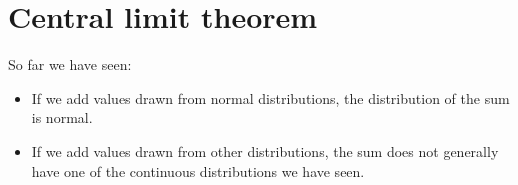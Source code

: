 \documentclass[12pt]{book}
\begin{document}

%
%
%
%

%
%






\section{Central limit theorem}
\label{CLT}

So far we have seen:

\begin{itemize}

\item If we add values drawn from normal distributions, the distribution
of the sum is normal.


\item If we add values drawn from other distributions, the sum does not
generally have one of the continuous distributions we have seen.

\end{itemize}
\end{document}
